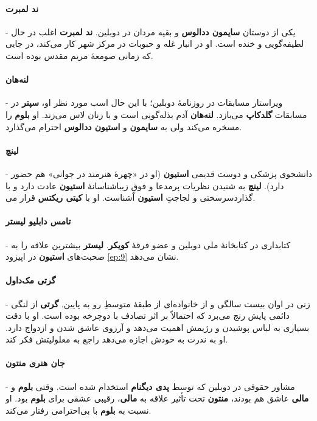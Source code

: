 \documentclass[12pt]{book}
\newcommand{\noun}[1]{{\textbf{#1}}}
\begin{document}
    \paragraph{\noun{ند لمبرت}\protect{}} -
    یکی از دوستان \noun{سایمون ددالوس‬} و بقیه مردان در دوبلین. \noun{ند لمبرت} اغلب در حال لطیفه‌گویی و خنده است. او در انبار غله و حبوبات در مرکز شهر کار می‌کند، در جایی که زمانی صومعهٔ مریم مقدس بوده است.
    \paragraph{\noun{لنه‌هان}\protect{}} -
    ویراستار مسابقات در روزنامهٔ دوبلین؛ با این حال اسب مورد نظر او، \noun{سپتر} در مسابقات \noun{گلدکاپ} می‌بازد. \noun{لنه‌هان} آدم بذله‌گویی است و با زنان لاس می‌زند. او \noun{بلوم} را مسخره می‌کند ولی به \noun{سایمون}  و \noun{استیون ددالوس} احترام می‌گذارد.
    \paragraph{\noun{لینچ}\protect{}} -
    دانشجوی پزشکی و دوست قدیمی \noun{استیون} (او در «چهرهٔ هنرمند در جوانی» هم حضور دارد). \noun{لینچ} به شنیدن نظریات پرمدعا و فوقِ زیباشناسانهٔ \noun{استیون} عادت دارد و با سرسختی و لجاجتِ \noun{استیون} آشناست. او با \noun{کیتی ریکتس} قرار می‎‌گذارد.
    \paragraph{\noun{تامس دابلیو لیستر}\protect{}} -
    کتابداری در کتابخانهٔ ملی دوبلین و عضو فرقهٔ \noun{کویکر}. \noun{لیستر} بیشترین علاقه را به صحبت‌های \noun{استیون} در اپیزود \ref{ep:9} نشان می‌دهد.
    \paragraph{\noun{گرتی مک‌داول}\protect{}} -
    زنی در اوان بیست سالگی و از خانواده‌ای از طبقهٔ متوسطِ رو به پایین. \noun{گرتی} از لنگی دائمی پایش رنج می‌برد که احتمالاً بر اثر تصادف با دوچرخه بوده است. او با دقت بسیاری به لباس پوشیدن و رژیمش اهمیت می‌دهد و آرزوی عاشق شدن و ازدواج دارد. او به ندرت به خودش اجازه می‌دهد راجع به معلولیتش فکر کند.
    \paragraph{\noun{جان هنری منتون}\protect{}} -
    مشاور حقوقی در دوبلین که توسط \noun{پدی دیگنام} استخدام شده است. وقتی \noun{بلوم} و \noun{مالی} عاشق هم بودند، \noun{منتون} تحت تأثیر علاقه به \noun{مالی}، رقیبی عشقی برای \noun{بلوم} بود. او نسبت به \noun{بلوم} با بی‌احترامی رفتار می‌کند.
\end{document}
